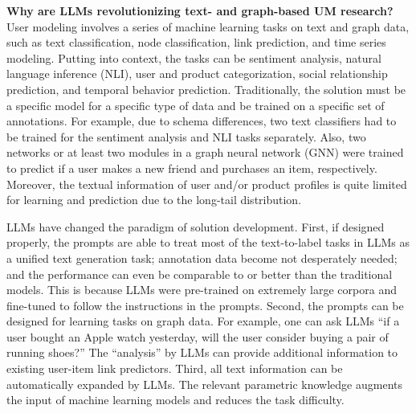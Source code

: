 \documentclass[11pt]{article}
\begin{document}

\vspace{0.05in}
\noindent \textbf{Why are LLMs revolutionizing text- and graph-based UM research?} 
User modeling involves a series of machine learning tasks on text and graph data, such as text classification, node classification, link prediction, and time series modeling. Putting into context, the tasks can be sentiment analysis, natural language inference (NLI), user and product categorization, social relationship prediction, and temporal behavior prediction. Traditionally, the solution must be a specific model for a specific type of data and be trained on a specific set of annotations. For example, due to schema differences, two text classifiers had to be trained for the sentiment analysis and NLI tasks separately. Also, two networks or at least two modules in a graph neural network (GNN) were trained to predict if a user makes a new friend and purchases an item, respectively. Moreover, the textual information of user and/or product profiles is quite limited for learning and prediction due to the long-tail distribution.

LLMs have changed the paradigm of solution development. First, if designed properly, the prompts are able to treat most of the text-to-label tasks in LLMs as a unified text generation task; annotation data become not desperately needed; and the performance can even be comparable to or better than the traditional models. This is because LLMs were pre-trained on extremely large corpora and fine-tuned to follow the instructions in the prompts. Second, the prompts can be designed for learning tasks on graph data. For example, one can ask LLMs ``if a user bought an Apple watch yesterday, will the user consider buying a pair of running shoes?'' The ``analysis'' by LLMs can provide additional information to existing user-item link predictors. Third, all text information can be automatically expanded by LLMs. The relevant parametric knowledge augments the input of machine learning models and reduces the task difficulty.
\end{document}
